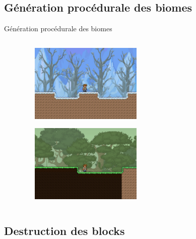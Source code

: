 \documentclass[aspectratio=169]{beamer}
\begin{document}
\subsection{Génération procédurale des biomes}

\begin{frame}{Génération procédurale des biomes}
    \begin{columns}
        \centering
        \begin{column}{0.5\textwidth}
            \centering
            \lipsum[1][1-5]
        \end{column}
        \begin{column}{0.5\textwidth}
            \centering
            \begin{figure}
                \centering
                \captionsetup{format=sanslabel}
                \includegraphics[width=0.5\textwidth]{assets/game_toundra.png}
            \end{figure}
            \begin{figure}
                \centering
                \captionsetup{format=sanslabel}
                \includegraphics[width=0.5\textwidth]{assets/game_jungle.png}
            \end{figure}
        \end{column}
    \end{columns}
\end{frame}

\subsection{Destruction des blocks}
\end{document}
